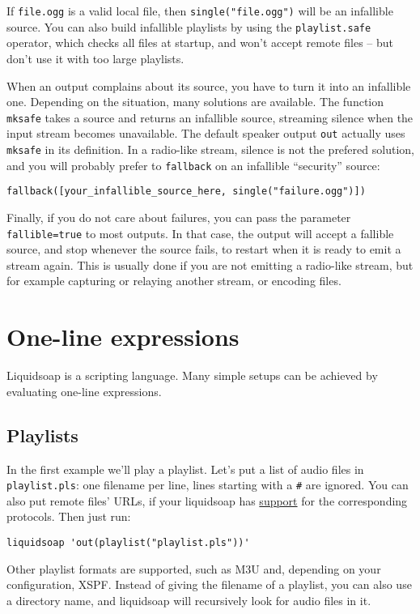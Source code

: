 \documentclass{book}
\begin{document}
If \verb+file.ogg+ is a valid local file, then \verb+single("file.ogg")+ will be
an infallible source.  You can also build infallible playlists by using the
\verb+playlist.safe+ operator, which checks all files at startup, and won't
accept remote files -- but don't use it with too large playlists.

When an output complains about its source, you have to turn it into an
infallible one. Depending on the situation, many solutions are available. The
function \verb+mksafe+ takes a source and returns an infallible source,
streaming silence when the input stream becomes unavailable.  The default
speaker output \verb+out+ actually uses \verb+mksafe+ in its definition. In a
radio-like stream, silence is not the prefered solution, and you will probably
prefer to \verb+fallback+ on an infallible ``security'' source:

\begin{verbatim}
fallback([your_infallible_source_here, single("failure.ogg")])
\end{verbatim}
Finally, if you do not care about failures, you can pass the parameter
\verb+fallible=true+ to most outputs. In that case, the output
will accept a fallible source, and stop whenever the source fails,
to restart when it is ready to emit a stream again.
This is usually done if you are not emitting a radio-like stream,
but for example capturing or relaying another stream,
or encoding files.

\section{One-line expressions}
Liquidsoap is a scripting language. Many simple setups can be achieved by
evaluating one-line expressions.

\subsection{Playlists}
In the first example we'll play a playlist. Let's put a list of audio files in
\verb+playlist.pls+: one filename per line, lines starting with a \verb+#+ are
ignored. You can also put remote files' URLs, if your liquidsoap has
\href{help.html#plugins}{support} for the corresponding protocols.  Then just
run:

\begin{verbatim}
liquidsoap 'out(playlist("playlist.pls"))'
\end{verbatim}
Other playlist formats are supported, such as M3U and, depending on your
configuration, XSPF. Instead of giving the filename of a playlist, you can also
use a directory name, and liquidsoap will recursively look for audio files in
it.
\end{document}
